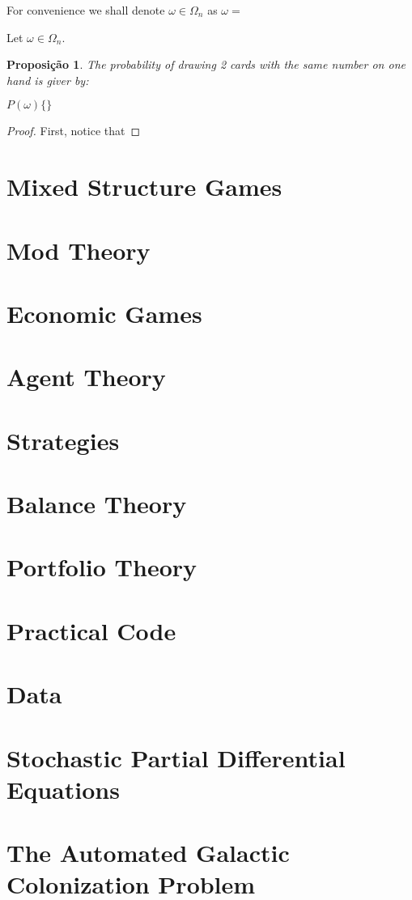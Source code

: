 \documentclass[]{article}
\newtheorem{proposition}{Proposição}[section]
\theoremstyle{definition}
\theoremstyle{definition}
\begin{document}
For convenience we shall denote $\omega \in \Omega_n$ as $\omega = $


	Let $\omega \in \Omega_n$. 

\begin{proposition}
	The probability of drawing 2 cards with the same number on one hand is giver by:
	
	\begin{center}
		$P(\omega) \{\} $
	\end{center}

\end{proposition}

\begin{proof}
	

	
	First, notice that 
\end{proof}

\section{Mixed Structure Games}
\section{Mod Theory}
\section{Economic Games}
\section{Agent Theory}
\section{Strategies}
\section{Balance Theory}
\section{Portfolio Theory}
\section{Practical Code}
\section{Data}
\section{Stochastic Partial Differential Equations}
\section{The Automated Galactic Colonization Problem}
\end{document}
